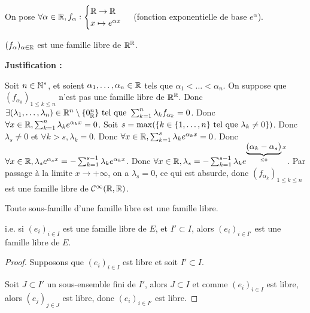 \documentclass[12pt, a4paper]{report}
\begin{document}
\begin{example}
    On pose $\forall \alpha \in \mathbb{R}, f_\alpha : \begin{cases} \mathbb{R} \to \mathbb{R} \\ x \mapsto e^{\alpha x} \end{cases}$ (fonction exponentielle de base $e^\alpha$).

    $(f_\alpha)_{\alpha \in \mathbb{R}}$ est une famille libre de $\mathbb{R}^{\mathbb{R}}$.

    \textbf{Justification :}

    \begin{outline}
        \1 Soit $n \in \mathbb{N}^*$, et soient $\alpha_1,\dots,\alpha_n \in \mathbb{R}$ tels que $\alpha_1<\dots<\alpha_n$.
        \1 On suppose que $(f_{\alpha_k})_{1 \le k \le n}$ n'est pas une famille libre de $\mathbb{R}^{\mathbb{R}}$.
        \1 Donc $\exists (\lambda_1,\dots,\lambda_n) \in \mathbb{R}^n\setminus\{0_{\mathbb{R}}^n\} \text{ tel que } \sum_{k=1}^n \lambda_k f_{\alpha_k} = 0$.
        \1 Donc $\forall x \in \mathbb{R}, \sum_{k=1}^n \lambda_k e^{\alpha_k x} = 0$.
        \1 Soit $s = \max(\{ k \in \{1,\dots,n\} \text{ tel que } \lambda_k \ne 0\})$.
        \1 Donc $\lambda_s \ne 0$ et $\forall k > s, \lambda_k = 0$.
        \1 Donc $\forall x \in \mathbb{R}, \sum_{k=1}^s \lambda_k e^{\alpha_k x} = 0$.
        \1 Donc $\forall x \in \mathbb{R}, \lambda_s e^{\alpha_s x} = -\sum_{k=1}^{s-1} \lambda_k e^{\alpha_k x}$.
        \1 Donc $\forall x \in \mathbb{R}, \lambda_s = -\sum_{k=1}^{s-1} \lambda_k e^{\underbrace{(\alpha_k - \alpha_s)}_{\le 0} x}$.
        \1 Par passage à la limite $x \to +\infty$, on a $\lambda_s = 0$, ce qui est absurde, donc $(f_{\alpha_k})_{1 \le k \le n}$ est une famille libre de $\mathcal{C}^{\infty}(\mathbb{R},\mathbb{R})$.
    \end{outline}
\end{example}

\begin{property}
    Toute sous-famille d'une famille libre est une famille libre.

    i.e. si $(e_i)_{i \in I}$ est une famille libre de $E$, et $I' \subset I$, alors $(e_i)_{i \in I'}$ est une famille libre de $E$.
\end{property}

\begin{proof}
    Supposons que $(e_i)_{i \in I}$ est libre et soit $I' \subset I$.
    
    Soit $J \subset I'$ un sous-ensemble fini de $I'$, alors $J \subset I$ et comme $(e_i)_{i \in I}$ est libre, alors $(e_j)_{j \in J}$ est libre, donc $(e_i)_{i \in I'}$ est libre.
\end{proof}
\end{document}

